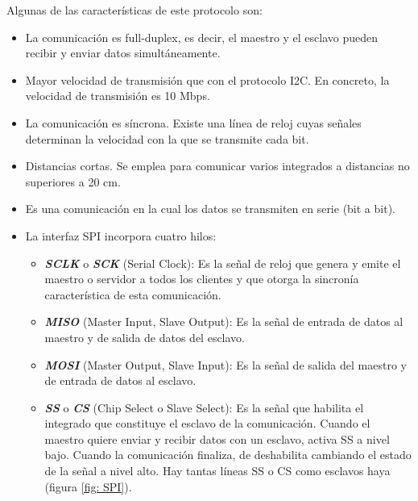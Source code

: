 Algunas de las características de este protocolo son:
\begin{itemize}
    \item La comunicación es full-duplex, es decir, el maestro y el esclavo pueden recibir y enviar datos simultáneamente.
    \item Mayor velocidad de transmisión que con el protocolo I2C. En concreto, la velocidad de transmisión es 10 Mbps.
    \item La comunicación es síncrona. Existe una línea de reloj cuyas señales determinan la velocidad con la que se transmite cada bit. 
    \item Distancias cortas. Se emplea para comunicar varios integrados a distancias no superiores a 20 cm.
    \item Es una comunicación en la cual los datos se transmiten en serie (bit a bit).
    \item La interfaz SPI incorpora cuatro hilos:
        \begin{itemize}
            \item {\itshape\bfseries SCLK} o {\itshape\bfseries SCK} (Serial Clock): Es la señal de reloj que genera y emite el maestro o servidor a todos los clientes y que otorga la sincronía característica de esta comunicación.
            \item {\itshape\bfseries MISO} (Master Input, Slave Output): Es la señal de entrada de datos al maestro y de salida de datos del esclavo.
            \item {\itshape\bfseries MOSI} (Master Output, Slave Input): Es la señal de salida del maestro y de entrada de datos al esclavo.
            \item {\itshape\bfseries SS} o {\itshape\bfseries CS} (Chip Select o Slave Select): Es la señal que habilita el integrado que constituye el esclavo de la comunicación. Cuando el maestro quiere enviar y recibir datos con un esclavo, activa SS a nivel bajo. Cuando la comunicación finaliza, de deshabilita cambiando el estado de la señal a nivel alto. Hay tantas líneas SS o CS como esclavos haya (figura \ref{fig: SPI}).
        \end{itemize}
\end{itemize}

